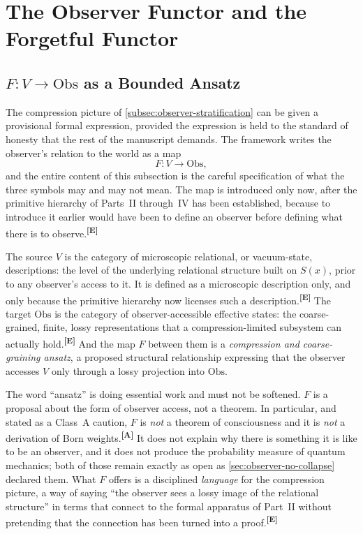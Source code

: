 \documentclass[12pt,a4paper,twoside]{article}
\theoremstyle{plain}
\theoremstyle{definition}
\theoremstyle{remark}
\newcommand{\catmark}[1]{\textsuperscript{\textsf{\textbf{[#1]}}}}
\begin{document}
\newpage
\section{The Observer Functor and the Forgetful Functor}
\label{sec:observer-functor}

\subsection{\texorpdfstring{$F\colon V \to \mathrm{Obs}$}{F: V to Obs} as a Bounded Ansatz}
\label{subsec:observer-functor-ansatz}

The compression picture of \cref{subsec:observer-stratification} can be given a provisional formal expression, provided the expression is held to the standard of honesty that the rest of the manuscript demands. The framework writes the observer's relation to the world as a map
\[
 F\colon V \longrightarrow \mathrm{Obs},
\]
and the entire content of this subsection is the careful specification of what the three symbols may and may not mean. The map is introduced only now, after the primitive hierarchy of Parts~II through~IV has been established, because to introduce it earlier would have been to define an observer before defining what there is to observe.\catmark{E}

The source $V$ is the category of microscopic relational, or vacuum-state, descriptions: the level of the underlying relational structure built on $S(x)$, prior to any observer's access to it. It is defined as a microscopic description only, and only because the primitive hierarchy now licenses such a description.\catmark{E} The target $\mathrm{Obs}$ is the category of observer-accessible effective states: the coarse-grained, finite, lossy representations that a compression-limited subsystem can actually hold.\catmark{E} And the map $F$ between them is a \emph{compression and coarse-graining ansatz}, a proposed structural relationship expressing that the observer accesses $V$ only through a lossy projection into $\mathrm{Obs}$.

The word ``ansatz'' is doing essential work and must not be softened. $F$ is a proposal about the form of observer access, not a theorem. In particular, and stated as a Class~A caution, $F$ is \emph{not} a theorem of consciousness and it is \emph{not} a derivation of Born weights.\catmark{A} It does not explain why there is something it is like to be an observer, and it does not produce the probability measure of quantum mechanics; both of those remain exactly as open as \cref{sec:observer-no-collapse} declared them. What $F$ offers is a disciplined \emph{language} for the compression picture, a way of saying ``the observer sees a lossy image of the relational structure'' in terms that connect to the formal apparatus of Part~II without pretending that the connection has been turned into a proof.\catmark{E}
\end{document}
